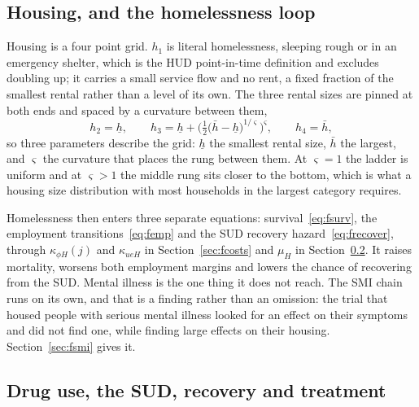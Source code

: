 \documentclass[10pt]{article}
\begin{document}
\subsection{Housing, and the homelessness loop}

Housing is a four point grid. $h_1$ is literal homelessness, sleeping rough or in
an emergency shelter, which is the HUD point-in-time definition and excludes
doubling up; it carries a small service flow and no rent, a fixed
fraction of the smallest rental rather than a level of its own. The three rental
sizes are pinned at both ends and spaced by a curvature between them,
\begin{equation}\label{eq:fhouse}
h_2=\underline h,\qquad
h_3=\underline h+\Big(\tfrac{1}{2}\big(\bar h-\underline h\big)^{1/\varsigma}\Big)^{\varsigma},
\qquad h_4=\bar h,
\end{equation}
so three parameters describe the grid: $\underline h$ the smallest
rental size, $\bar h$ the largest, and $\varsigma$ the curvature that
places the rung between them. At $\varsigma=1$ the ladder is uniform and at
$\varsigma>1$ the middle rung sits closer to the bottom, which is what a housing
size distribution with most households in the largest category requires.

Homelessness then enters three separate equations: survival~\eqref{eq:fsurv},
the employment transitions~\eqref{eq:femp} and the SUD recovery
hazard~\eqref{eq:frecover}, through $\kappa_{\phi H}(j)$ and $\kappa_{ueH}$
in Section~\ref{sec:fcosts} and $\mu_H$ in Section~\ref{sec:fdrug}. It raises
mortality, worsens both employment margins and lowers the chance of
recovering from the SUD. Mental illness is the one thing it does not reach.
The SMI chain runs on its own, and that is a finding rather than an omission: the
trial that housed people with serious mental illness looked for an effect on
their symptoms and did not find one, while finding large effects on their
housing. Section~\ref{sec:fsmi} gives it.

\subsection{Drug use, the SUD, recovery and treatment}\label{sec:fdrug}
\end{document}
